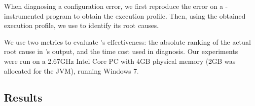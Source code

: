 
When diagnosing a configuration error, we first reproduce the
error on a \ourtool-instrumented program to obtain the
execution profile. Then, using the obtained execution profile, we use \ourtool
to identify its root causes.


We use two metrics to evaluate \ourtool's effectiveness:
the absolute ranking of the actual root cause in \ourtool's output,
and the time cost used in diagnosis.
Our experiments were run on a
2.67GHz Intel Core PC with 4GB physical memory (2GB was allocated
for the JVM), running Windows 7.


\subsection{Results}
\label{sec:results}

